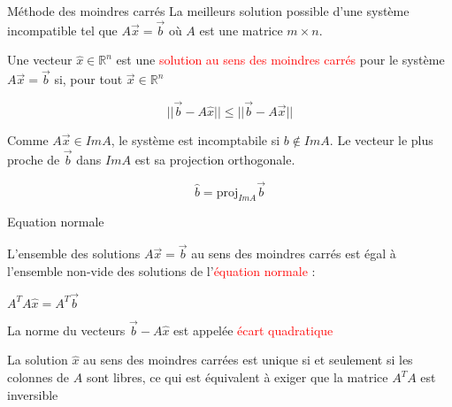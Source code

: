 \begin{parag}{Méthode des moindres carrés}
La meilleurs solution possible d'une système incompatible tel que $A\vec{x} = \vec{b}$ où $A$ est une matrice $m \times n$.
    \begin{definition}
        Une vecteur $\hat{x} \in \mathbb{R}^n$ est une \textcolor{red}{solution au sens des moindres carrés} pour le système $A\vec{x} = \vec{b}$ si, pour tout $\vec{x} \in \mathbb{R}^n$
        \begin{formule}
            \[||\vec{b} - A\hat{x}|| \leq || \vec{b} - A\vec{x}||\]
        \end{formule}
    \end{definition}
    \begin{truc}
        Comme $A\vec{x} \in ImA$, le système est incomptabile si $b \notin ImA$. Le vecteur le plus proche de $\vec{b}$ dans $ImA$ est sa projection orthogonale.
        \begin{formule}
            \[\hat{b} = \text{proj}_{ImA}\vec{b}\]
        \end{formule}
    \end{truc}
    \begin{subparag}{Equation normale}
        \begin{theoreme}
            L'ensemble des solutions $A\vec{x} = \vec{b}$ au sens des moindres carrés est égal à l'ensemble non-vide des solutions de l'\textcolor{red}{équation normale} : 
            \begin{formule}
                $A^TA\hat{x} = A^T\vec{b}$
            \end{formule}
        \end{theoreme}
        \begin{truc}
            La norme du vecteurs $\vec{b} - A\hat{x}$ est appelée \textcolor{red}{écart quadratique}
        \end{truc}
        \begin{theoreme}
            La solution $\hat{x}$ au sens des moindres carrées est unique si et seulement si les colonnes de $A$ sont libres, ce qui est équivalent à exiger que la matrice $A^TA$ est inversible
        \end{theoreme}
    \end{subparag}
\end{parag}

